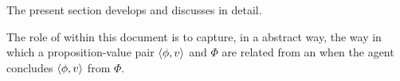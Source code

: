 




\section{}
\label{cha:var:ros}

\begin{note}
  The present section develops and discusses  in detail.

  The role of  within this document is to capture, in a abstract way, the way in which a proposition-value pair \(\langle \phi, v \rangle\) and \pool{} \(\Phi\) are related from an \agpe{} when the agent concludes \(\langle \phi, v \rangle\) from \(\Phi\).
\end{note}

